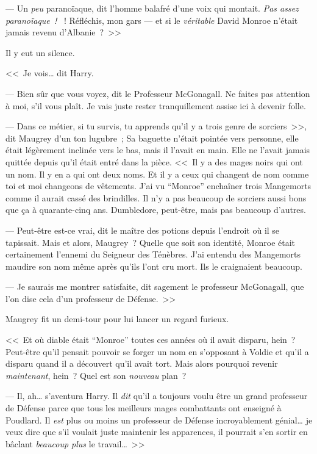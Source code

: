 --- Un \emph{peu} paranoïaque, dit l'homme balafré d'une voix qui montait. \emph{Pas assez paranoïaque~! }~! Réfléchis, mon gars — et si le \emph{véritable} David Monroe n'était jamais revenu d'Albanie~?~>>

Il y eut un silence.

<<~Je vois… dit Harry.

--- Bien sûr que vous voyez, dit le Professeur McGonagall. Ne faites pas attention à moi, s'il vous plaît. Je vais juste rester tranquillement assise ici à devenir folle.

--- Dans ce métier, si tu survis, tu apprends qu'il y a trois genre de sorciers~>>, dit Maugrey d'un ton lugubre~; Sa baguette n'était pointée vers personne, elle était légèrement inclinée vers le bas, mais il l'avait en main. Elle ne l'avait jamais quittée depuis qu'il était entré dans la pièce. <<~Il y a des mages noirs qui ont un nom. Il y en a qui ont deux noms. Et il y a ceux qui changent de nom comme toi et moi changeons de vêtements. J'ai vu “Monroe” enchaîner trois Mangemorts comme il aurait cassé des brindilles. Il n'y a pas beaucoup de sorciers aussi bons que ça à quarante-cinq ans. Dumbledore, peut-être, mais pas beaucoup d'autres.

--- Peut-être est-ce vrai, dit le maître des potions depuis l'endroit où il se tapissait. Mais et alors, Maugrey~? Quelle que soit son identité, Monroe était certainement l'ennemi du Seigneur des Ténèbres. J'ai entendu des Mangemorts maudire son nom même après qu'ils l'ont cru mort. Ils le craignaient beaucoup.

--- Je saurais me montrer satisfaite, dit sagement le professeur McGonagall, que l'on dise cela d'un professeur de Défense.~>>

Maugrey fit un demi-tour pour lui lancer un regard furieux.

<<~Et où diable était “Monroe” toutes ces années où il avait disparu, hein~? Peut-être qu'il pensait pouvoir se forger un nom en s'opposant à Voldie et qu'il a disparu quand il a découvert qu'il avait tort. Mais alors pourquoi revenir \emph{maintenant}, hein~? Quel est son \emph{nouveau} plan~?

--- Il, ah… s'aventura Harry. Il \emph{dit} qu'il a toujours voulu être un grand professeur de Défense parce que tous les meilleurs mages combattants ont enseigné à Poudlard. Il \emph{est} plus ou moins un professeur de Défense incroyablement génial… je veux dire que s'il voulait juste maintenir les apparences, il pourrait s'en sortir en bâclant \emph{beaucoup plus} le travail…~>>

